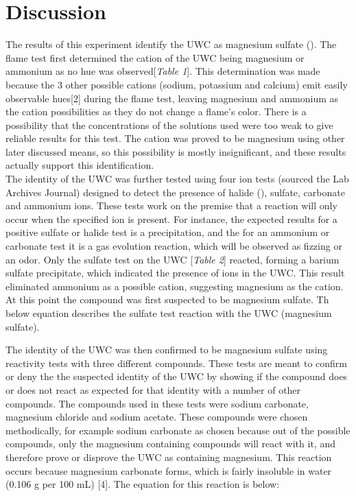 \documentclass[12pt]{article}
\begin{document}
\section{Discussion}\doublespacing
The results of this experiment identify the UWC as magnesium sulfate (). The flame test first determined the cation of the UWC being magnesium or ammonium as no hue was observed[\textit{Table 1}]. This determination was made because the 3 other possible cations (sodium, potassium and calcium) emit easily observable hues[2] during the flame test, leaving magnesium and ammonium as the cation possibilities as they do not change a flame's color. There is a possibility that  the concentrations of the solutions used were too weak to give reliable results for this test. The cation was proved to be magnesium using other later discussed means, so this possibility is mostly insignificant, and these results actually support this identification.
\vspace{12pt}\\The identity of the UWC was further tested using four ion tests (sourced the Lab Archives Journal) designed to detect the presence of halide (), sulfate, carbonate and ammonium ions. These tests work on the premise that a reaction will only occur when the specified ion is present. For instance, the expected results for a positive sulfate or halide test is a precipitation, and the for an ammonium or carbonate test it is a gas evolution reaction, which will be observed as fizzing or an odor. Only the sulfate test on the UWC [\textit{Table 2}] reacted, forming a barium sulfate precipitate, which indicated the presence of  ions in the UWC. This result eliminated ammonium as a possible cation, suggesting magnesium as the cation. At this point the compound was first suspected to be magnesium sulfate. Th below equation describes the sulfate test reaction with the UWC (magnesium sulfate).
\begin{center}
\end{center}
The identity of the UWC was then confirmed to be magnesium sulfate using reactivity tests with three different compounds. These tests are meant to confirm or deny the the suspected identity of the UWC by showing if the compound does or does not react as expected for that identity with a number of other compounds. The compounds used in these tests were sodium carbonate, magnesium chloride and sodium acetate. These compounds were chosen methodically, for example sodium carbonate as chosen because out of the possible compounds, only the magnesium containing compounds will react with it, and therefore prove or disprove the UWC as containing magnesium. This reaction occurs because magnesium carbonate forms, which is fairly insoluble in water (0.106 g per 100 mL) [4]. The equation for this reaction is below:
\end{document}
